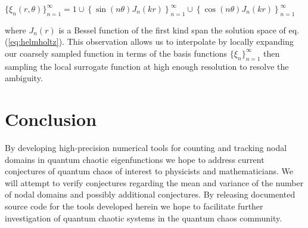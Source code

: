 \documentclass[english]{article}
\begin{document}
\begin{multicols}{2}
\begin{center}
$\{\xi_{n}\left(r, \theta\right)\}_{n=1}^{\infty}=1\cup\left\{ \sin\left(n\theta\right)J_{n}\left(kr\right)\right\} _{n=1}^{\infty}\cup\left\{ \cos\left(n\theta\right)J_{n}\left(kr\right)\right\} _{n=1}^{\infty}$
\end{center}
where $J_{n}\left(r\right)$ is a Bessel function of the first kind span the solution space of eq. (\ref{eq:helmholtz}). This observation allows us to interpolate by locally expanding our coarsely sampled function in terms of the basis functions $\{\xi_{n}\}_{n=1}^{\infty}$ then sampling the local surrogate function at high enough resolution to resolve the ambiguity.

\section*{Conclusion}
By developing high-precision numerical tools for counting and tracking nodal domains in quantum chaotic eigenfunctions we hope to address current conjectures of quantum chaos of interest to physicists and mathematicians. We will attempt to verify conjectures regarding the mean and variance of the number of nodal domains and possibly additional conjectures. By releasing documented source code for the tools developed herein we hope to facilitate further investigation of quantum chaotic systems in the quantum chaos community.




\end{multicols}
\end{document}
